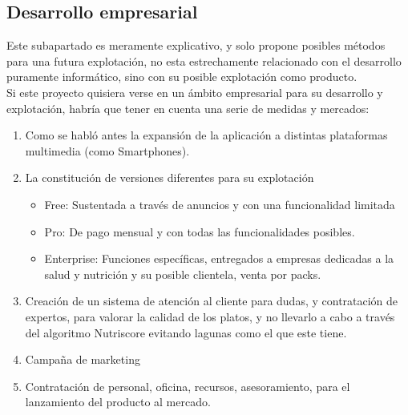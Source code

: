 \subsection{Desarrollo empresarial}
Este subapartado es meramente explicativo, y solo propone posibles métodos para una futura explotación, no esta estrechamente relacionado con el desarrollo puramente informático, sino con su posible explotación como producto.
\\
Si este proyecto quisiera verse en un ámbito empresarial para su desarrollo y explotación, habría que tener en cuenta una serie de medidas y mercados:
\begin{enumerate}
\item	Como se habló antes la expansión de la aplicación a distintas plataformas multimedia (como Smartphones).
\item	La constitución de versiones diferentes para su explotación
\begin{itemize}
\item	Free: Sustentada a través de anuncios y con una funcionalidad limitada
\item	Pro: De pago mensual y con todas las funcionalidades posibles.
\item	Enterprise: Funciones específicas, entregados a empresas dedicadas a la salud y nutrición y su posible clientela, venta por packs.
\end{itemize}
\item	Creación de un sistema de atención al cliente para dudas, y contratación de expertos, para valorar la calidad de los platos, y no llevarlo a cabo a través del algoritmo Nutriscore evitando lagunas como el que este tiene.
\item	Campaña de marketing
\item	Contratación de personal, oficina, recursos, asesoramiento, para el lanzamiento del producto al mercado.
\end{enumerate}
